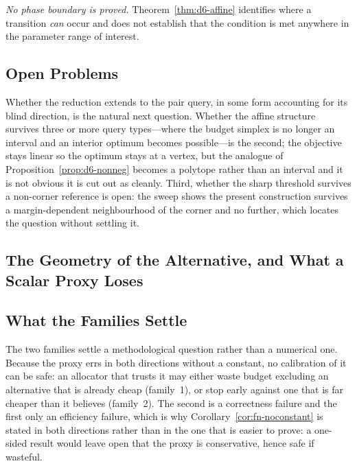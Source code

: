 \emph{No phase boundary is proved.} Theorem~\ref{thm:d6-affine} identifies where a transition
\emph{can} occur and does not establish that the condition is met anywhere in the parameter
range of interest.

\subsection{Open Problems}

Whether the reduction extends to the pair query, in some form accounting for its blind
direction, is the natural next question. Whether the affine structure survives three or more
query types---where the budget simplex is no longer an interval and an interior optimum
becomes possible---is the second; the objective stays linear so the optimum stays at a
vertex, but the analogue of Proposition~\ref{prop:d6-nonneg} becomes a polytope rather than an
interval and it is not obvious it is cut out as cleanly. Third, whether the sharp threshold
survives a non-corner reference is open: the sweep shows the present construction survives a
margin-dependent neighbourhood of the corner and no further, which locates the question
without settling it.


\subsection{The Geometry of the Alternative, and What a Scalar Proxy Loses}
\label{sec:fn-discussion}

\subsection{What the Families Settle}

The two families settle a methodological question rather than a numerical one. Because the
proxy errs in both directions without a constant, no calibration of it can be safe: an
allocator that trusts it may either waste budget excluding an alternative that is already
cheap (family~1), or stop early against one that is far cheaper than it believes (family~2).
The second is a correctness failure and the first only an efficiency failure, which is why
Corollary~\ref{cor:fn-noconstant} is stated in both directions rather than in the one that is
easier to prove: a one-sided result would leave open that the proxy is conservative, hence
safe if wasteful.

